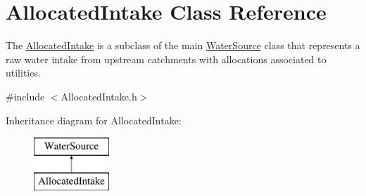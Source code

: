 \hypertarget{classAllocatedIntake}{}\section{Allocated\+Intake Class Reference}
\label{classAllocatedIntake}


The {\ttfamily \mbox{\hyperlink{classAllocatedIntake}{Allocated\+Intake}}} is a subclass of the main {\ttfamily \mbox{\hyperlink{classWaterSource}{Water\+Source}}} class that represents a raw water intake from upstream catchments with allocations associated to utilities.  




{\ttfamily \#include $<$Allocated\+Intake.\+h$>$}

Inheritance diagram for Allocated\+Intake\+:\begin{figure}[H]
\begin{center}
\leavevmode
\includegraphics[height=2.000000cm]{classAllocatedIntake}
\end{center}
\end{figure}
